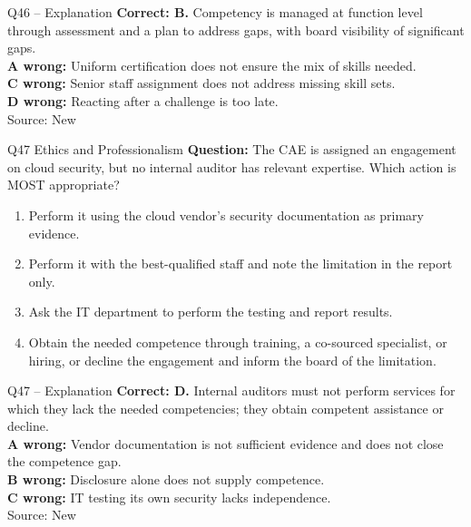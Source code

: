 \documentclass[aspectratio=169,10pt]{beamer}
\begin{document}
\begin{frame}[t]{Q46 -- Explanation}
	\footnotesize
	\textbf{Correct: B.} Competency is managed at function level through assessment and a plan to address gaps, with board visibility of significant gaps. \\[5pt]
\textbf{A wrong:} Uniform certification does not ensure the mix of skills needed. \\[3pt]
\textbf{C wrong:} Senior staff assignment does not address missing skill sets. \\[3pt]
\textbf{D wrong:} Reacting after a challenge is too late. \\[3pt]
	\vfill {\tiny Source: New}
\end{frame}

\begin{frame}[t]{Q47 \hfill {\scriptsize Ethics and Professionalism}}
	\small
	\textbf{Question:} The CAE is assigned an engagement on cloud security, but no internal auditor has relevant expertise. Which action is MOST appropriate?
	\begin{enumerate}[label=\Alph*.,itemsep=1pt,topsep=3pt]
			\item Perform it using the cloud vendor's security documentation as primary evidence.
			\item Perform it with the best-qualified staff and note the limitation in the report only.
			\item Ask the IT department to perform the testing and report results.
			\item Obtain the needed competence through training, a co-sourced specialist, or hiring, or decline the engagement and inform the board of the limitation.
	\end{enumerate}
\end{frame}

\begin{frame}[t]{Q47 -- Explanation}
	\footnotesize
	\textbf{Correct: D.} Internal auditors must not perform services for which they lack the needed competencies; they obtain competent assistance or decline. \\[5pt]
\textbf{A wrong:} Vendor documentation is not sufficient evidence and does not close the competence gap. \\[3pt]
\textbf{B wrong:} Disclosure alone does not supply competence. \\[3pt]
\textbf{C wrong:} IT testing its own security lacks independence. \\[3pt]
	\vfill {\tiny Source: New}
\end{frame}
\end{document}
